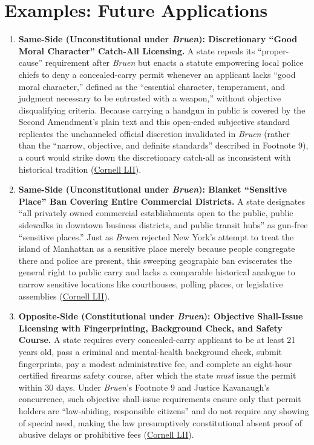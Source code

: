 \documentclass[12pt]{article}
\begin{document}
\section{Examples: Future Applications}

\begin{enumerate}
    \item \textbf{Same-Side (Unconstitutional under \textit{Bruen}): Discretionary ``Good Moral Character'' Catch-All Licensing.} A state repeals its ``proper-cause'' requirement after \textit{Bruen} but enacts a statute empowering local police chiefs to deny a concealed-carry permit whenever an applicant lacks ``good moral character,'' defined as the ``essential character, temperament, and judgment necessary to be entrusted with a weapon,'' without objective disqualifying criteria. Because carrying a handgun in public is covered by the Second Amendment's plain text and this open-ended subjective standard replicates the unchanneled official discretion invalidated in \textit{Bruen} (rather than the ``narrow, objective, and definite standards'' described in Footnote 9), a court would strike down the discretionary catch-all as inconsistent with historical tradition (\href{https://www.law.cornell.edu/supremecourt/text/20-843}{Cornell LII}).

    \item \textbf{Same-Side (Unconstitutional under \textit{Bruen}): Blanket ``Sensitive Place'' Ban Covering Entire Commercial Districts.} A state designates ``all privately owned commercial establishments open to the public, public sidewalks in downtown business districts, and public transit hubs'' as gun-free ``sensitive places.'' Just as \textit{Bruen} rejected New York's attempt to treat the island of Manhattan as a sensitive place merely because people congregate there and police are present, this sweeping geographic ban eviscerates the general right to public carry and lacks a comparable historical analogue to narrow sensitive locations like courthouses, polling places, or legislative assemblies (\href{https://www.law.cornell.edu/supremecourt/text/20-843}{Cornell LII}).

    \item \textbf{Opposite-Side (Constitutional under \textit{Bruen}): Objective Shall-Issue Licensing with Fingerprinting, Background Check, and Safety Course.} A state requires every concealed-carry applicant to be at least 21 years old, pass a criminal and mental-health background check, submit fingerprints, pay a modest administrative fee, and complete an eight-hour certified firearms safety course, after which the state \textit{must} issue the permit within 30 days. Under \textit{Bruen}'s Footnote 9 and Justice Kavanaugh's concurrence, such objective shall-issue requirements ensure only that permit holders are ``law-abiding, responsible citizens'' and do not require any showing of special need, making the law presumptively constitutional absent proof of abusive delays or prohibitive fees (\href{https://www.law.cornell.edu/supremecourt/text/20-843}{Cornell LII}).


\end{enumerate}
\end{document}
